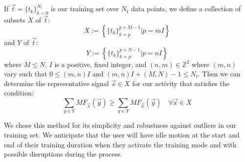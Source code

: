 \documentclass[journal]{IEEEtran}
\begin{document}
If $\vec{t} = \{t_k\}_{k=0}^{N_t}$ is our training set over $N_t$ data points, we define a collection of subsets $X$ of $\vec{t}$:
%
\begin{equation} \label{X_subsets_of_training_eq}
X := \left \{ \{t_k\}_{k=p}^{p+M-1} | p=mI \right \}
\end{equation}
%
and $Y$ of $\vec{t}$:
%
\begin{equation} \label{Y_subsets_of_training_eq}
Y := \left \{ \{t_k\}_{k=p}^{p+N-1} | p=nI \right \}
\end{equation}
%
where $M \leq N$, $I$ is a positive, fixed integer, and $(n,m) \in \mathbb{Z}^2$ where $(m,n)$ vary such that $0 \leq (m,n)I$ and $(m,n)I + (M,N) - 1 \leq N_t$. Then we can determine the representative signal $\vec{s} \in X$ for our activity that satisfies the condition:
%
\begin{equation} \label{s_condition}
\sum_{y \in Y}MF_{\vec{s}}(\vec{y}) \geq \sum_{y \in Y}MF_{\vec{x}}(\vec{y}) \quad \forall \vec{x} \in X
\end{equation}

We chose this method for its simplicity and robustness against outliers in our training set. We anticipate that the user will have idle motion at the start and end of their training duration when they activate the training mode and with possible disruptions during the process.
%
%
\end{document}
